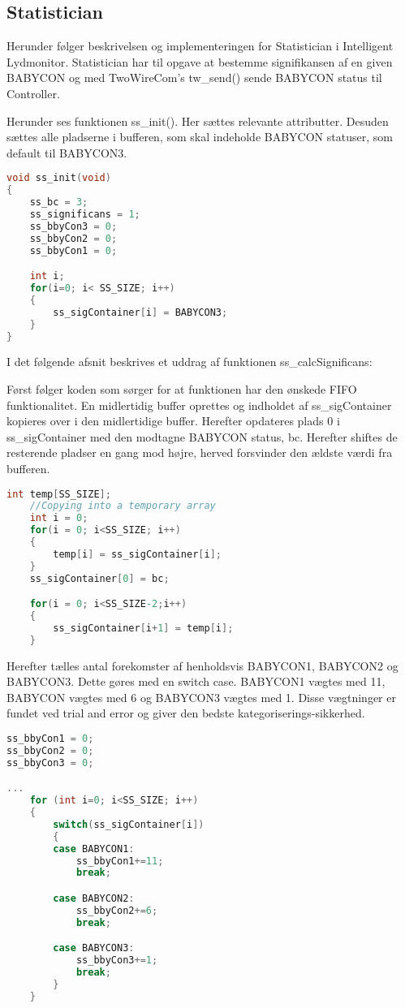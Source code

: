 \subsection*{Statistician}
Herunder følger beskrivelsen og implementeringen for Statistician i Intelligent Lydmonitor.
Statistician har til opgave at bestemme signifikansen af en given BABYCON og med TwoWireCom's tw\_send() sende BABYCON status til Controller. 

Herunder ses funktionen ss\_init(). Her sættes relevante attributter. Desuden sættes alle pladserne i bufferen, som skal indeholde BABYCON statuser, som default til BABYCON3.
\begin{lstlisting}[language=C,numbers=none]
void ss_init(void)
{
    ss_bc = 3;
    ss_significans = 1;
    ss_bbyCon3 = 0;
    ss_bbyCon2 = 0;
    ss_bbyCon1 = 0;

    int i;
    for(i=0; i< SS_SIZE; i++)
    {
        ss_sigContainer[i] = BABYCON3;
    }
}
\end{lstlisting}

I det følgende afsnit beskrives et uddrag af funktionen ss\_calcSignificans: 

Først følger koden som sørger for at funktionen har den ønskede FIFO funktionalitet. En midlertidig buffer oprettes og indholdet af ss\_sigContainer kopieres over i den midlertidige buffer. Herefter opdateres plads 0 i ss\_sigContainer med den modtagne BABYCON status, bc. Herefter shiftes de resterende pladser en gang mod højre, herved forsvinder den ældste værdi fra bufferen. 

\begin{lstlisting}[language=C,numbers=none]
int temp[SS_SIZE];
    //Copying into a temporary array
    int i = 0;
    for(i = 0; i<SS_SIZE; i++)
    {
        temp[i] = ss_sigContainer[i];
    }
    ss_sigContainer[0] = bc;

    for(i = 0; i<SS_SIZE-2;i++)
    {
        ss_sigContainer[i+1] = temp[i];
    }
\end{lstlisting}

Herefter tælles antal forekomster af henholdsvis BABYCON1, BABYCON2 og BABYCON3. Dette gøres med en switch case. BABYCON1 vægtes med 11, BABYCON vægtes med 6 og BABYCON3 vægtes med 1. Disse vægtninger er fundet ved trial and error og giver den bedste kategoriserings-sikkerhed. 

\begin{lstlisting}[language=C,numbers=none]
ss_bbyCon1 = 0;
ss_bbyCon2 = 0;
ss_bbyCon3 = 0;

...
    for (int i=0; i<SS_SIZE; i++)
    {
        switch(ss_sigContainer[i])
        {
        case BABYCON1:
            ss_bbyCon1+=11;
            break;

        case BABYCON2:
            ss_bbyCon2+=6;
            break;

        case BABYCON3:
            ss_bbyCon3+=1;
            break;
        }
    }
\end{lstlisting}

